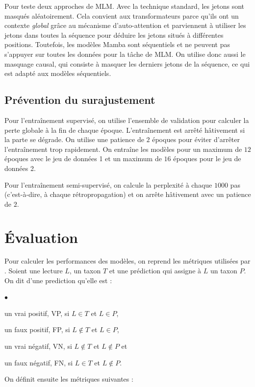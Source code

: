 Pour teste deux approches de MLM. Avec la technique standard, les jetons sont masqués aléatoirement.
Cela convient aux transformateurs parce qu'ils ont un contexte \textit{global} grâce au mécanisme
d'auto-attention et parviennent à utiliser les jetons dans toutes la séquence pour déduire les
jetons situés à différentes positions. Toutefois, les modèles Mamba sont séquentiels et ne peuvent
pas s'appuyer sur toutes les données pour la tâche de MLM. On utilise donc aussi le masquage causal,
qui consiste à masquer les derniers jetons de la séquence, ce qui est adapté aux modèles
séquentiels.

\subsection{Prévention du surajustement}
Pour l'entraînement supervisé, on utilise l'ensemble de validation pour calculer la perte globale à
la fin de chaque époque. L'entraînement est arrêté hâtivement si la parte se dégrade. On utilise une
patience de $2$ époques pour éviter d'arrêter l'entraînement trop rapidement. On entraîne les
modèles pour un maximum de $12$ époques avec le jeu de données 1 et un maximum de $16$ époques pour
le jeu de données 2.

Pour l'entraînement semi-supervisé, on calcule la perplexité à chaque $1000$ pas (c'est-à-dire, à
chaque rétropropagation) et on arrête hâtivement avec un patience de $2$.

\section{Évaluation}
Pour calculer les performances des modèles, on reprend les métriques utilisées par
\cite{portik2022}. Soient une lecture $L$, un taxon $T$ et une prédiction qui assigne à $L$ un taxon
$P$. On dit d'une prediction qu'elle est :

\begin{list}{$\bullet$}{}
    \item un vrai positif, VP, si $L \in T$ et $L \in P$,
    \item un faux positif, FP, si $L \notin T$ et $L \in P$,
    \item un vrai négatif, VN, si $L \notin T$ et $L \notin P$ et
    \item un faux négatif, FN, si $L \in T$ et $L \notin P$.
\end{list}

On définit ensuite les métriques suivantes :

